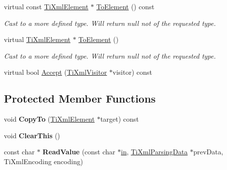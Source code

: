 \begin{DoxyCompactItemize}
\item 
\hypertarget{classTiXmlElement_ac5b8d0e25fa23fd9acbb6d146082901c}{virtual const \hyperlink{classTiXmlElement}{\-Ti\-Xml\-Element} $\ast$ \hyperlink{classTiXmlElement_ac5b8d0e25fa23fd9acbb6d146082901c}{\-To\-Element} () const }\label{classTiXmlElement_ac5b8d0e25fa23fd9acbb6d146082901c}

\begin{DoxyCompactList}\small\item\em \-Cast to a more defined type. \-Will return null not of the requested type. \end{DoxyCompactList}\item 
\hypertarget{classTiXmlElement_a9def86337ea7a755eb41cac980f60c7a}{virtual \hyperlink{classTiXmlElement}{\-Ti\-Xml\-Element} $\ast$ \hyperlink{classTiXmlElement_a9def86337ea7a755eb41cac980f60c7a}{\-To\-Element} ()}\label{classTiXmlElement_a9def86337ea7a755eb41cac980f60c7a}

\begin{DoxyCompactList}\small\item\em \-Cast to a more defined type. \-Will return null not of the requested type. \end{DoxyCompactList}\item 
virtual bool \hyperlink{classTiXmlElement_a31ab28cc3b892a69254391d6bbe08df3}{\-Accept} (\hyperlink{classTiXmlVisitor}{\-Ti\-Xml\-Visitor} $\ast$visitor) const 
\end{DoxyCompactItemize}
\subsection*{\-Protected \-Member \-Functions}
\begin{DoxyCompactItemize}
\item 
\hypertarget{classTiXmlElement_a9e0c1983b840de4134f1f6bf7af00b0f}{void {\bfseries \-Copy\-To} (\hyperlink{classTiXmlElement}{\-Ti\-Xml\-Element} $\ast$target) const }\label{classTiXmlElement_a9e0c1983b840de4134f1f6bf7af00b0f}

\item 
\hypertarget{classTiXmlElement_a5670933ec2d7d9763b9891acc05d7f7d}{void {\bfseries \-Clear\-This} ()}\label{classTiXmlElement_a5670933ec2d7d9763b9891acc05d7f7d}

\item 
\hypertarget{classTiXmlElement_ac786bce103042d3837c4cc2ff6967d41}{const char $\ast$ {\bfseries \-Read\-Value} (const char $\ast$\hyperlink{structin}{in}, \hyperlink{classTiXmlParsingData}{\-Ti\-Xml\-Parsing\-Data} $\ast$prev\-Data, \-Ti\-Xml\-Encoding encoding)}\label{classTiXmlElement_ac786bce103042d3837c4cc2ff6967d41}

\end{DoxyCompactItemize}


